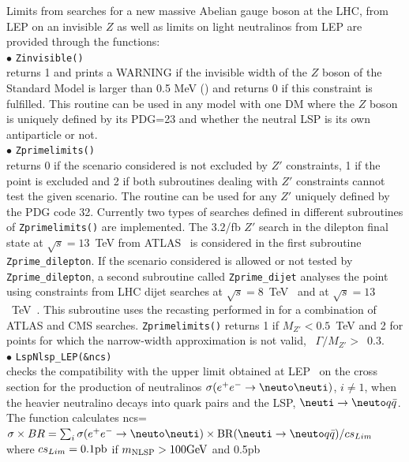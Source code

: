 \documentclass[12pt,a4paper]{article}
\begin{document}
Limits from searches for a new massive Abelian gauge boson at the LHC, from LEP on an invisible $Z$ as well as limits on light neutralinos from LEP are provided through the functions: \\[2mm]
%
\noi$\bullet$ \verb|Zinvisible()|\\
returns 1 and prints a WARNING if the invisible width of the $Z$ boson of the Standard Model 
is larger than 0.5 MeV (\cite{Freitas:2014hra}) and returns 0 if this constraint is fulfilled.
This routine can be used in any model with one DM where the $Z$ boson is  uniquely defined by its PDG=23 and whether the neutral LSP is its own antiparticle or not.\\[2mm]
%
\noi$\bullet$ \verb|Zprimelimits()|\\
returns 0 if the scenario considered is not excluded by $Z'$ constraints, 1 if the point is excluded and 2 if both subroutines dealing with $Z'$ constraints cannot test the given scenario. The routine can be used for any $Z'$ uniquely defined by the PDG code 32.
Currently two types of searches defined in different subroutines of \verb|Zprimelimits()| are implemented.
The $3.2$/fb $Z'$ search in the dilepton final state at $\sqrt{s} = 13$~TeV from ATLAS~\cite{Aaboud:2016cth} is considered in the first subroutine \verb|Zprime_dilepton|. If the scenario considered is allowed or not tested by \verb|Zprime_dilepton|, a second subroutine called \verb|Zprime_dijet| analyses the point using constraints from LHC dijet searches at $\sqrt{s} = 8$~TeV~\cite{Aad:2014aqa,Khachatryan:2015sja,Khachatryan:2016ecr} and at $\sqrt{s} = 13$~TeV~\cite{ATLAS:2015nsi,Khachatryan:2015dcf}. This subroutine uses the recasting  performed  in \cite{Fairbairn:2016iuf} for a combination of ATLAS and CMS searches.
\verb|Zprimelimits()| returns 1 if $M_{Z'}<0.5$~TeV and  2 for points  for which the narrow-width approximation is not valid, \ie~$\Gamma/M_{Z'}>$~0.3.\\[2mm]
%
\noi$\bullet$   \verb|LspNlsp_LEP(&ncs)|\\
checks  the compatibility with the upper limit obtained at LEP~\cite{Abbiendi:2003sc} on the cross section for the production of neutralinos 
$\sigma(e^+e^-\rightarrow \neuto\neuti)$, $i\neq 1$, when the heavier neutralino decays into quark pairs 
and the LSP, $\neuti \rightarrow \neuto q\bar{q}$. The function 
  calculates ncs= $\sigma \times BR = \sum_i \sigma(e^+e^-\rightarrow \neuto\neuti)\times {\rm BR}(\neuti \rightarrow \neuto
q\bar{q})/cs_{Lim} $  where $cs_{Lim}=0.1{\rm pb}$  if $m_{\rm NLSP}>100{\rm GeV}$ and 0.5pb
\end{document}
